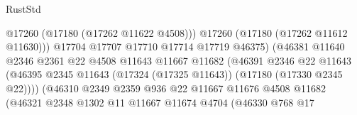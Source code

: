 \begin{lexlean}{RustStd}
\begin{coremodule}
                                                  @17260
                                                  (@17180 (@17262 @11622 @4508)))
                                                @17260
                                                (@17180 (@17262 @11612 @11630)))
                                              @17704
                                              @17707
                                              @17710
                                              @17714
                                              @17719
                                              @46375)
                                            (@46381
                                              @11640
                                              @2346
                                              @2361
                                              @22
                                              @4508
                                              @11643
                                              @11667
                                              @11682
                                              (@46391
                                                @2346
                                                @22
                                                @11643
                                                (@46395
                                                  @2345
                                                  @11643
                                                  (@17324 (@17325 @11643))
                                                  (@17180 (@17330 @2345 @22))))
                                              (@46310
                                                @2349
                                                @2359
                                                @936
                                                @22
                                                @11667
                                                @11676
                                                @4508
                                                @11682
                                                (@46321
                                                  @2348
                                                  @1302
                                                  @11
                                                  @11667
                                                  @11674
                                                  @4704
                                                  (@46330
                                                    @768
                                                    @17

\end{coremodule}
\end{lexlean}
